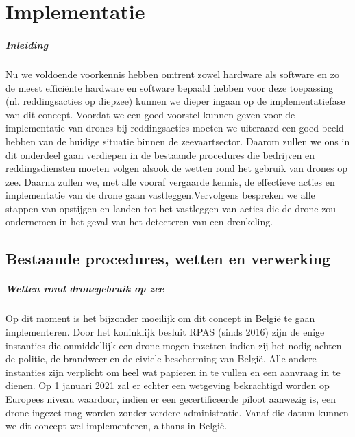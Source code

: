 \chapter{Implementatie}
\label{ch:implementatie}

\paragraph{Inleiding}

Nu we voldoende voorkennis hebben omtrent zowel hardware als software en zo de meest efficiënte hardware en software bepaald hebben voor deze toepassing (nl. reddingsacties op diepzee) kunnen we dieper ingaan op de implementatiefase van dit concept. Voordat we een goed voorstel kunnen geven voor de implementatie van drones bij reddingsacties moeten we uiteraard een goed beeld hebben van de huidige situatie binnen de zeevaartsector. Daarom zullen we ons in dit onderdeel gaan verdiepen in de bestaande procedures die bedrijven en reddingsdiensten moeten volgen alsook de wetten rond het gebruik van drones op zee. Daarna zullen we, met alle vooraf vergaarde kennis, de effectieve acties en implementatie van de drone gaan vastleggen.Vervolgens bespreken we alle stappen van opstijgen en landen tot het vastleggen van acties die de drone zou ondernemen in het geval van het detecteren van een drenkeling. 

\section{Bestaande procedures, wetten en verwerking}

\paragraph{Wetten rond dronegebruik op zee}

Op dit moment is het bijzonder moeilijk om dit concept in België te gaan implementeren. Door het koninklijk besluit RPAS (sinds 2016) zijn de enige instanties die onmiddellijk een drone mogen inzetten indien zij het nodig achten de politie, de brandweer en de civiele bescherming van België. Alle andere instanties zijn verplicht om heel wat papieren in te vullen en een aanvraag in te dienen. Op 1 januari 2021 zal er echter een wetgeving bekrachtigd worden op Europees niveau waardoor, indien er een gecertificeerde piloot aanwezig is, een drone ingezet mag worden zonder verdere administratie. Vanaf die datum kunnen we dit concept wel implementeren, althans in België. 

